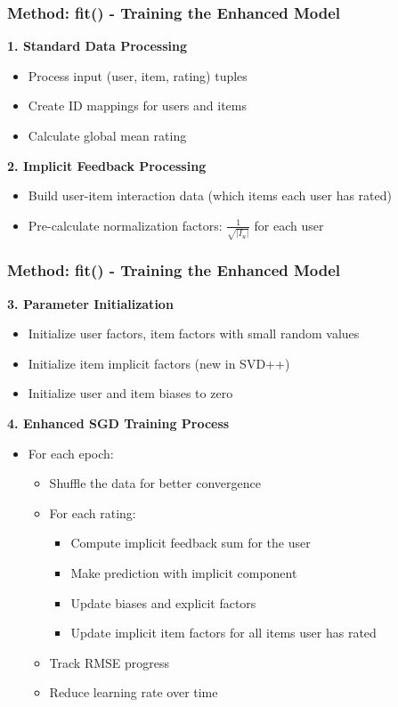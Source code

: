 \documentclass{beamer}
\begin{document}
\begin{frame}
\frametitle{Method: fit() - Training the Enhanced Model}
    \textbf{1. Standard Data Processing}
    \begin{itemize}
        \item Process input (user, item, rating) tuples
        \item Create ID mappings for users and items
        \item Calculate global mean rating
    \end{itemize}

    \vspace{1cm}
    
    \textbf{2. Implicit Feedback Processing}
    \begin{itemize}
        \item Build user-item interaction data (which items each user has rated)
        \item Pre-calculate normalization factors: $\frac{1}{\sqrt{|I_u|}}$ for each user
    \end{itemize}
\end{frame}

\begin{frame}
\frametitle{Method: fit() - Training the Enhanced Model}    
    \textbf{3. Parameter Initialization}
    \begin{itemize}
        \item Initialize user factors, item factors with small random values
        \item Initialize item implicit factors (new in SVD++)
        \item Initialize user and item biases to zero
    \end{itemize}

    \vspace{1cm}
    
    \textbf{4. Enhanced SGD Training Process}
    \begin{itemize}
        \item For each epoch:
        \begin{itemize}
            \item Shuffle the data for better convergence
            \item For each rating:
            \begin{itemize}
                \item Compute implicit feedback sum for the user
                \item Make prediction with implicit component
                \item Update biases and explicit factors
                \item Update implicit item factors for all items user has rated
            \end{itemize}
            \item Track RMSE progress
            \item Reduce learning rate over time
        \end{itemize}
    \end{itemize}
\end{frame}
\end{document}
